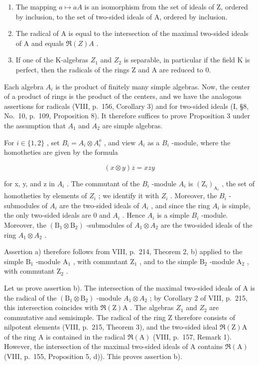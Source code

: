 \begin{enumerate}
\def\labelenumi{\alph{enumi})}
\item
  The mapping \(a \mapsto aA\) is an isomorphism from the set of ideals of Z, ordered by inclusion, to the set of two-sided ideals of A, ordered by inclusion.
\item
  The radical of A is equal to the intersection of the maximal two-sided ideals of A and equals \(\Re(Z)A\) .
\item
  If one of the K-algebras \(Z_{1}\) and \(Z_{2}\) is separable, in particular if the field K is perfect, then the radicals of the rings Z and A are reduced to 0.
\end{enumerate}

Each algebra \(A_{i}\) is the product of finitely many simple algebras. Now, the center of a product of rings is the product of the centers, and we have the analogous assertions for radicals (VIII, p.~156, Corollary 3) and for two-sided ideals (I, §8, No.~10, p.~109, Proposition 8). It therefore suffices to prove Proposition 3 under the assumption that \(A_{1}\) and \(A_{2}\) are simple algebras.

For \(i \in \{1,2\}\) , set \(B_i = A_i \otimes A_i^o\) , and view \(A_i\) as a \(B_i\) -module, where the homotheties are given by the formula

\[
(x \otimes y) z = x z y
\]

for x, y, and z in \(A_{i}\) . The commutant of the \(B_{i}\) -module \(A_{i}\) is \((\mathrm{Z}_{i})_{\mathrm{A}_{i}}\) , the set of homotheties by elements of \(Z_{i}\) ; we identify it with \(Z_{i}\) . Moreover, the \(B_{i}\) -submodules of \(A_{i}\) are the two-sided ideals of \(A_{i}\) , and since the ring \(A_{i}\) is simple, the only two-sided ideals are 0 and \(A_{i}\) . Hence \(A_{i}\) is a simple \(B_{i}\) -module. Moreover, the \((\mathrm{B}_{1}\otimes\mathrm{B}_{2})\) -submodules of \(A_{1}\otimes A_{2}\) are the two-sided ideals of the ring \(A_{1}\otimes A_{2}\) .

Assertion a) therefore follows from VIII, p.~214, Theorem 2, b) applied to the simple \(\mathrm{B}_1\) -module \(\mathrm{A}_1\) , with commutant \(\mathrm{Z}_1\) , and to the simple \(\mathrm{B}_2\) -module \(\mathrm{A}_2\) , with commutant \(\mathrm{Z}_2\) .

Let us prove assertion b). The intersection of the maximal two-sided ideals of A is the radical of the \((\mathrm{B}_{1}\otimes\mathrm{B}_{2})\) -module \(A_{1}\otimes A_{2}\) ; by Corollary 2 of VIII, p.~215, this intersection coincides with \(\Re(\mathrm{Z})\mathrm{A}\) . The algebras \(Z_{1}\) and \(Z_{2}\) are commutative and semisimple. The radical of the ring Z therefore consists of nilpotent elements (VIII, p.~215, Theorem 3), and the two-sided ideal \(\Re(\mathrm{Z})\mathrm{A}\) of the ring A is contained in the radical \(\Re(\mathrm{A})\) (VIII, p.~157, Remark 1). However, the intersection of the maximal two-sided ideals of A contains \(\Re(\mathrm{A})\) (VIII, p.~155, Proposition 5, d)). This proves assertion b).

